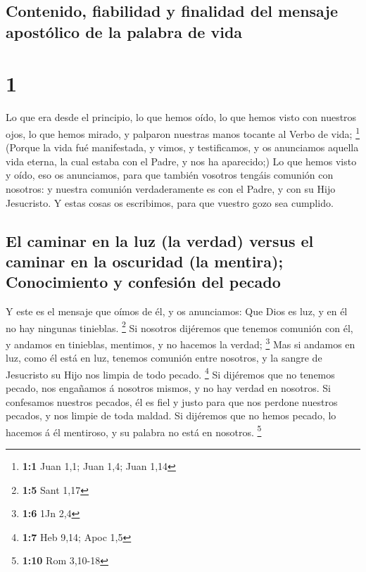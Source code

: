 \hypertarget{contenido-fiabilidad-y-finalidad-del-mensaje-apostuxf3lico-de-la-palabra-de-vida}{%
\subsection{Contenido, fiabilidad y finalidad del mensaje apostólico de
la palabra de
vida}\label{contenido-fiabilidad-y-finalidad-del-mensaje-apostuxf3lico-de-la-palabra-de-vida}}

\hypertarget{section}{%
\section{1}\label{section}}

 Lo que era desde el principio, lo que hemos oído, lo que
hemos visto con nuestros ojos, lo que hemos mirado, y palparon nuestras
manos tocante al Verbo de vida; \footnote{\textbf{1:1} Juan 1,1; Juan
  1,4; Juan 1,14}  (Porque la vida fué manifestada, y vimos,
y testificamos, y os anunciamos aquella vida eterna, la cual estaba con
el Padre, y nos ha aparecido;)  Lo que hemos visto y oído,
eso os anunciamos, para que también vosotros tengáis comunión con
nosotros: y nuestra comunión verdaderamente es con el Padre, y con su
Hijo Jesucristo.  Y estas cosas os escribimos, para que
vuestro gozo sea cumplido.

\hypertarget{el-caminar-en-la-luz-la-verdad-versus-el-caminar-en-la-oscuridad-la-mentira-conocimiento-y-confesiuxf3n-del-pecado}{%
\subsection{El caminar en la luz (la verdad) versus el caminar en la
oscuridad (la mentira); Conocimiento y confesión del
pecado}\label{el-caminar-en-la-luz-la-verdad-versus-el-caminar-en-la-oscuridad-la-mentira-conocimiento-y-confesiuxf3n-del-pecado}}

 Y este es el mensaje que oímos de él, y os anunciamos: Que
Dios es luz, y en él no hay ningunas tinieblas. \footnote{\textbf{1:5}
  Sant 1,17}  Si nosotros dijéremos que tenemos comunión con
él, y andamos en tinieblas, mentimos, y no hacemos la verdad;
\footnote{\textbf{1:6} 1Jn 2,4}  Mas si andamos en luz, como
él está en luz, tenemos comunión entre nosotros, y la sangre de
Jesucristo su Hijo nos limpia de todo pecado. \footnote{\textbf{1:7} Heb
  9,14; Apoc 1,5}  Si dijéremos que no tenemos pecado, nos
engañamos á nosotros mismos, y no hay verdad en nosotros. 
Si confesamos nuestros pecados, él es fiel y justo para que nos perdone
nuestros pecados, y nos limpie de toda maldad.  Si
dijéremos que no hemos pecado, lo hacemos á él mentiroso, y su palabra
no está en nosotros. \footnote{\textbf{1:10} Rom 3,10-18}

